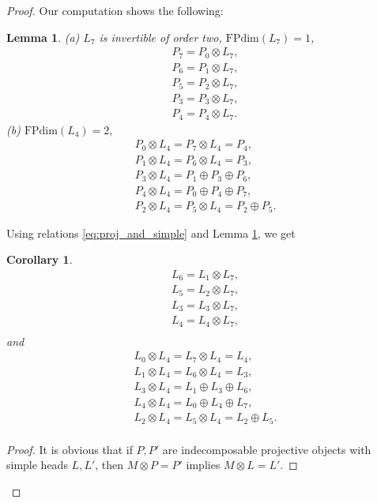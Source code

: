 \documentclass{amsart}
\newtheorem{lemma}[theorem]{Lemma}
\newtheorem{corollary}[theorem]{Corollary}
\theoremstyle{definition}
\newcommand{\FP}{\text{FPdim}}
\numberwithin{equation}{section}
\begin{document}
\begin{proof}
    Our computation shows the following:
    \begin{lemma} \label{lemma:tens_simp_by_proj}
        (a) $L_7$ is invertible of order two, $\FP(L_7) = 1$, 
        \begin{align*}
            P_7 = P_0\otimes L_7,\\
            P_6=P_1\otimes L_7,\\
            P_5 = P_2\otimes L_7,\\
            P_3 = P_3\otimes L_7,\\
            P_4 = P_4\otimes L_7.
        \end{align*}
        (b) $\FP(L_4) = 2,$ 
        \begin{align*}
            P_0\otimes L_4 = P_7\otimes L_4 = P_4,\\
            P_1\otimes L_4 = P_6\otimes L_4 = P_3,\\
            P_3\otimes L_4 = P_1\oplus P_3\oplus P_6,\\
            P_4\otimes L_4 = P_0\oplus P_4 \oplus P_7,\\
            P_2\otimes L_4 = P_5\otimes L_4 = P_2\oplus P_5.
        \end{align*}
    \end{lemma}
    Using relations \ref{eq:proj_and_simple} and Lemma \ref{lemma:tens_simp_by_proj}, we get 
    \begin{corollary} \label{cor:tens_simp_by_proj}
        \begin{align*}
            L_6 = L_1\otimes L_7,\\
            L_5 = L_2\otimes L_7,\\
            L_3 = L_3\otimes L_7,\\
            L_4 = L_4\otimes L_7,\\
        \end{align*}
        and
        \begin{align*}
            L_0\otimes L_4 = L_7\otimes L_4=L_4,\\
            L_1\otimes L_4 = L_6\otimes L_4 = L_3,\\
            L_3\otimes L_4 = L_1\oplus L_3\oplus L_6,\\
            L_4\otimes L_4 = L_0\oplus L_4\oplus L_7,\\
            L_2\otimes L_4 = L_5\otimes L_4 = L_2\oplus L_5.\\
        \end{align*}
    \end{corollary}
    \begin{proof}
        It is obvious that if $P,P'$ are indecomposable projective objects with simple heads $L, L'$, then $M\otimes P = P'$ implies $M\otimes L=L'$. 
        

\end{proof}
\end{proof}
\end{document}
